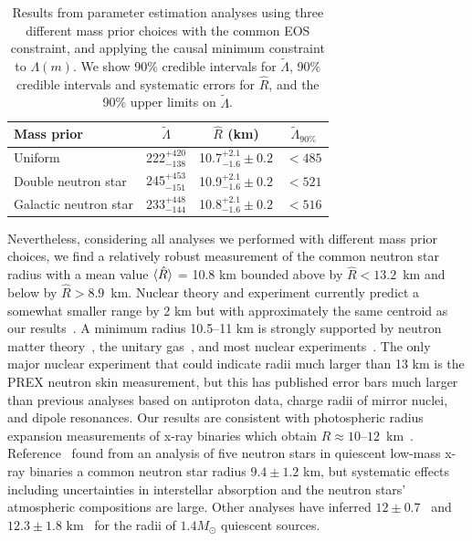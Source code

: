 \begin{table}[t]\label{tab:parameters}
\setlength{\tabcolsep}{3.8pt}
\centering\begin{tabular}{lccc} 
\hline
\rule{0pt}{3ex}%
Mass prior \quad & \quad $\tilde{\Lambda}$ \quad & \quad $\hat{R}$ (km) \quad & \quad $\tilde{\Lambda}_{90\%}$\quad \\\hline
\rule{0pt}{3ex}%
Uniform & 222$^{+420}_{-138}$ & 10.7$^{+2.1}_{-1.6}\pm 0.2$ & $< 485$\\
Double neutron star & 245$^{+453}_{-151}$ & 10.9$^{+2.1}_{-1.6}\pm 0.2$ & $< 521$ \\
Galactic neutron star & 
233$^{+448}_{-144}$ & 10.8$^{+2.1}_{-1.6}\pm 0.2$ & $< 516$ \\
\hline
\end{tabular}
\caption{Results from parameter estimation analyses using three different mass prior choices with the common EOS constraint, and applying the causal minimum constraint to $\Lambda(m)$. We show 90$\%$ credible intervals for $\tilde{\Lambda}$, 90$\%$ credible intervals and systematic errors for $\hat{R}$, %
and the 90\% upper limits on $\tilde\Lambda$.%
}
\label{tab:summary_table}
\end{table}
Nevertheless, considering all analyses we performed with different mass prior choices, we find a relatively robust measurement of the common neutron star radius with a mean value $\langle \large \hat R \rangle$ = 10.8 km bounded above by $\hat R < 13.2$~km and below by $\hat R > 8.9$~km. Nuclear theory and experiment currently predict a somewhat smaller range by 2 km but with approximately the same centroid as our results~\cite{Lattimer:2012nd,Lattimer:2012xj}. A minimum radius 10.5--11 km is strongly supported by neutron matter theory~\cite{Gandolfi:2011xu,Lynn:2015jua,Drischler:2015eba}, the unitary gas~\cite{Kolomeitsev:2016sjl}, and most nuclear experiments~\cite{Lattimer:2012nd,Lattimer:2012xj,Tews:2012fj}. The only major nuclear experiment that could indicate radii much larger than 13 km is the PREX neutron skin measurement, but this has published error bars much larger than previous analyses based on antiproton data, charge radii of mirror nuclei, and dipole resonances. 
Our results are consistent with photospheric radius expansion measurements of x-ray binaries which obtain $R \approx 10$--$12$~km~\cite{Ozel:2016oaf,Steiner:2010fz,Degenaar:2018lle}. Reference~\cite{Guillot:2014lla} found from an analysis of five neutron stars in quiescent low-mass x-ray binaries a common neutron star radius $9.4\pm1.2$ km, but systematic effects including uncertainties in interstellar absorption and the neutron stars' atmospheric compositions are large. Other analyses have inferred $12\pm0.7$~\cite{Lattimer:2013hma} and $12.3\pm1.8$ km~\cite{Shaw:2018wxh} for the radii of $1.4M_\odot$ quiescent sources. 

